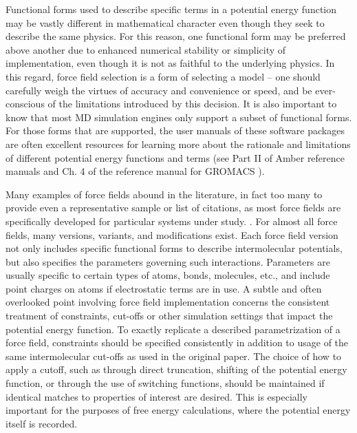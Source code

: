 \documentclass[9pt,bestpractices]{livecoms}
\begin{document}
Functional forms used to describe specific terms in a potential energy function may be vastly different in mathematical character even though they seek to describe the same physics.
For this reason, one functional form may be preferred above another due to  enhanced numerical stability or simplicity of implementation, even though it is not as faithful to the underlying physics.
In this regard, force field selection is a form of selecting a model -- one should carefully weigh the virtues of accuracy and convenience or speed, and be ever-conscious of the limitations introduced by this decision.
It is also important to know that most MD simulation engines only support a subset of functional forms.
For those forms that are supported, the user manuals of these software packages are often excellent resources for learning more about the rationale and limitations of different potential energy functions and terms (see Part II of Amber reference manuals\citep{AmberManual} and Ch. 4 of the reference manual for GROMACS \citep{GROMACSManual}).

Many examples of force fields abound in the literature, in fact too many to provide even a representative sample or list of citations, as most force fields are specifically developed for particular systems under study.
.
For almost all force fields, many versions, variants, and modifications exist.
Each force field version not only includes specific functional forms to describe intermolecular potentials, but also specifies the parameters governing such interactions.
Parameters are usually specific to certain types of atoms, bonds, molecules, etc., and include point charges on atoms if electrostatic terms are in use. 
A subtle and often overlooked point involving force field implementation concerns the consistent treatment of constraints, cut-offs or other simulation settings that impact the potential energy function.
To exactly replicate a described parametrization of a force field, constraints should be specified consistently in addition to usage of the same intermolecular cut-offs as used in the original paper.
The choice of how to apply a cutoff, such as through direct truncation, shifting of the potential energy function, or through the use of switching functions, should be maintained if identical matches to properties of interest are desired.
This is especially important for the purposes of free energy calculations, where the potential energy itself is recorded.
\end{document}
